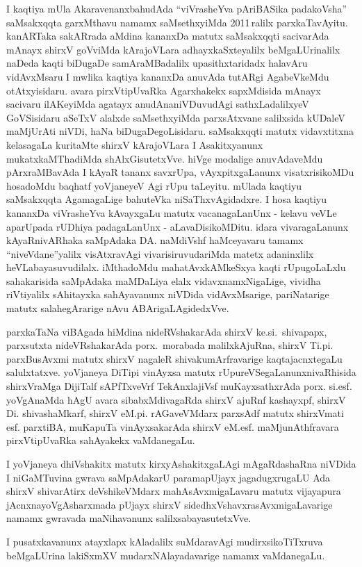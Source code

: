 I kaqtiya mUla AkaravenanxbahudAda ``viVrasheYva pAriBASika padakoVsha'' saMsakxqqta garxMthavu namamx saMsethxyiMda 2011\,ralilx parxkaTavAyitu. kanARTaka sakARrada aMdina kananxDa matutx saMsakxqqti sacivarAda mAnayx shirxV goVviMda kArajoVLara adhayxkaSxte\-yalilx beMgaLUrinalilx naDeda kaqti biDugaDe samAraMBadalilx upasithxtaridadx halavAru vidAvxMsaru I mwlika kaqtiya kananxDa anuvAda \hbox{tutARgi} AgabeVkeMdu otAtxyisidaru. avara pirxVtipUvaRka Agarxhakekx sapxMdisida mAnayx sacivaru ilAKeyiMda agatayx anudAna\break niVDuvudAgi sathxLadalilxyeV GoVSisidaru aSeTxV alalxde saMsethxyiMda parxsAtxvane salilxsida kUDaleV maMjUrAti niVDi, haNa biDugaDegoLisidaru. saMsakxqqti matutx vidavxtitxna kelasagaLa kuritaMte shirxV kArajoVLara I Asakitxyanunx mukatxkaMThadiMda shAlxGisutetxVve. hiVge modalige anuvAdaveMdu pArxraMBavAda I kAyaR tananx savxrUpa, vAyxpitxgaLanunx visatxrisikoMDu hosadoMdu baqhatf \hbox{yoVjaneyeV} Agi rUpu taLeyitu. mUlada kaqtiyu saMsakxqqta AgamagaLige bahuteVka niSaThxvAgidadxre. I hosa kaqtiyu kananxDa \hbox{viVrasheYva} kAvayxgaLu matutx vacanagaLanUnx - kelavu veVLe aparUpada rUDhiya padagaLanUnx - aLavaDisikoMDitu. idara vivara\-gaLanunx kAyaR\-nivARhaka saMpAdaka DA. naMdiVshf haMceyavaru tamamx ``niveVdane''yalilx visAtxravAgi vivarisiruvudariMda matetx adaninxlilx heVLabayasuvudilalx. iMthadoMdu mahatAvxkAMkeSxya kaqti rUpugoLaLxlu sahakarisida saMpAdaka maMDaLiya elalx vidavxnamxNi\-gaLige, vividha riVtiyalilx sAhitayxka sahAyavanunx niVDida vidAvxMsarige, pariNatarige matutx salahegArarige nAvu ABAri\-gaLA\-gidedxVve.

\smallskip

parxkaTaNa viBAgada hiMdina nideRVshakarAda shirxV ke.si.~shivapapx, parxsutxta nideVRshakarAda porx.~morabada malilxkAjuRna, shirxV Ti.pi. parxBusAvxmi matutx shirxV nagaleR shivakumArfravarige kaqtajacnxtegaLu salulxtatxve. yoVjaneya DiTipi vinAyxsa matutx rUpureVSegaLanunx\break nivaRhisida shirxVraMga DijiTalf sAPfTxveVrf TekAnxlajiVsf muKayxsathxrAda porx. si.esf. \hbox{yoVgAnaMda} hAgU avara sibabxMdivagaRda shirxV ajuRnf kashayxpf, shirxV Di. shivashaMkarf, shirxV eM.pi. rAGaveVMdarx parxsAdf matutx shirxVmati esf. parxtiBA, muKapuTa vinAyxsakarAda shirxV eM.esf. maMjunAthfravara pirxVtipUvaRka sahAyakekx vaMdanegaLu.

\smallskip

I yoVjaneya dhiVshakitx matutx kirxyAshakitxgaLAgi mAgaRdashaRna niVDida I niGaMTuvina gwrava saMpAdakarU paramapUjayx jagadugxrugaLU Ada shirxV shivarAtirx deVshikeVMdarx mahAsAvxmigaLavaru matutx vijayapura jAcnxnayoVgAsharxmada pUjayx shirxV sidedhxVshavxrasAvxmigaLavarige namamx gwravada maNihavanunx salilxsa\-bayasutetxVve.

\smallskip

I pusatxkavanunx atayxlapx kAladalilx suMdaravAgi mudirxsikoTiTxruva beMgaLUrina lakiSxmXV mudarxNAlayadavarige namamx vaMdanegaLu.

